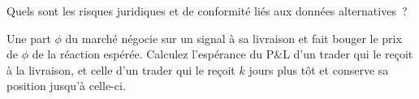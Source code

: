 \begin{interviewq}\label{iq:s1:alternative-data-strategies:5}
Quels sont les risques juridiques et de conformité liés aux données alternatives~?
\end{interviewq}

\begin{interviewq}\label{iq:s1:alternative-data-strategies:6}
Une part $\phi$ du marché négocie sur un signal à sa livraison et fait bouger le prix de $\phi$ de la réaction espérée. Calculez l'espérance du P\&L d'un trader qui
le reçoit à la livraison, et celle d'un trader qui le reçoit $k$ jours plus tôt et conserve sa position jusqu'à celle-ci.
\end{interviewq}
